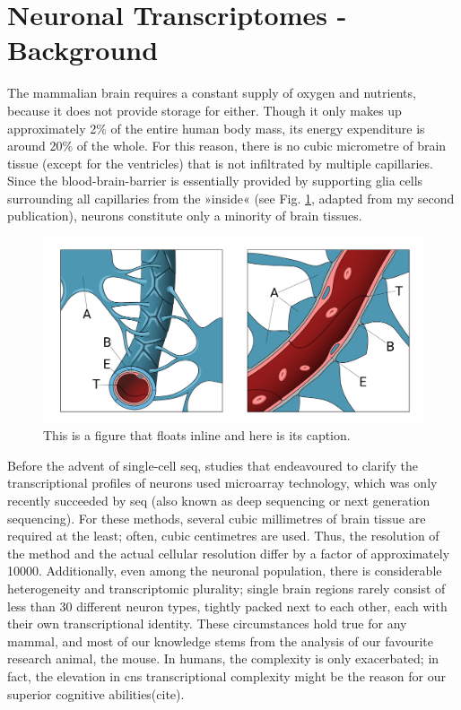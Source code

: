 \section{Neuronal Transcriptomes - Background}
The mammalian brain requires a constant supply of oxygen and nutrients, because it does not provide storage for either. Though it only makes up approximately 2\% of the entire human body mass, its energy expenditure is around 20\% of the whole\cite{Raichle2002}. For this reason, there is no cubic micrometre of brain tissue (except for the ventricles) that is not infiltrated by multiple capillaries. Since the blood-brain-barrier is essentially provided by supporting glia cells surrounding all capillaries from the »inside« (see Fig. \ref{fig:bbb}, adapted from my second publication\cite{Lobentanzer2019b}), neurons constitute only a minority of brain tissues.

\begin{figure}
\includegraphics[width=\textwidth]{figures/bbb}
\caption[Short figure name.]{This is a figure that floats inline and here is its caption.
\label{fig:bbb}}
\end{figure}

Before the advent of single-cell \ac{seq}, studies that endeavoured to clarify the transcriptional profiles of neurons used microarray technology, which was only recently succeeded by \ac{seq} (also known as deep sequencing or next generation sequencing). For these methods, several cubic millimetres of brain tissue are required at the least; often, cubic centimetres are used. Thus, the resolution of the method and the actual cellular resolution differ by a factor of approximately \num{10000}. Additionally, even among the neuronal population, there is considerable heterogeneity and transcriptomic plurality; single brain regions rarely consist of less than 30 different neuron types, tightly packed next to each other, each with their own transcriptional identity\cite{Darmanis2015, Zeisel2015, Tasic2016, Habib2016, Zeisel2018}. These circumstances hold true for any mammal, and most of our knowledge stems from the analysis of our favourite research animal, the mouse. In humans, the complexity is only exacerbated; in fact, the elevation in \ac{cns} transcriptional complexity might be the reason for our superior cognitive abilities(cite).

